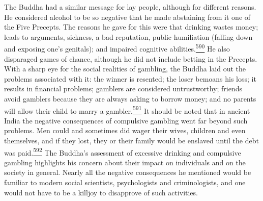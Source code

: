 The Buddha had a similar message for lay people, although for different
reasons. He considered alcohol to be so negative that he made abstaining
from it one of the Five Precepts. The reasons he gave for this were that
drinking wastes money; leads to arguments, sickness, a bad reputation,
public humiliation (falling down and exposing one's genitals); and
impaired cognitive
abilities.\label{footprints_split_015.html_fnref590}\hyperref[footprints_split_025.htmlux5cux23fn590]{\textsuperscript{590}}
He also disparaged games of chance, although he did not include betting
in the Precepts. With a sharp eye for the social realities of gambling,
the Buddha laid out the problems associated with it: the winner is
resented; the loser bemoans his loss; it results in financial problems;
gamblers are considered untrustworthy; friends avoid gamblers because
they are always asking to borrow money; and no parents will allow their
child to marry a
gambler.\label{footprints_split_015.html_fnref591}\hyperref[footprints_split_025.htmlux5cux23fn591]{\textsuperscript{591}}
It should be noted that in ancient India the negative consequences of
compulsive gambling went far beyond such problems. Men could and
sometimes did wager their wives, children and even themselves, and if
they lost, they or their family would be enslaved until the debt was
paid.\label{footprints_split_015.html_fnref592}\hyperref[footprints_split_025.htmlux5cux23fn592]{\textsuperscript{592}}
The Buddha's assessment of excessive drinking and compulsive gambling
highlights his concern about their impact on individuals and on the
society in general. Nearly all the negative consequences he mentioned
would be familiar to modern social scientists, psychologists and
criminologists, and one would not have to be a killjoy to disapprove of
such activities.

